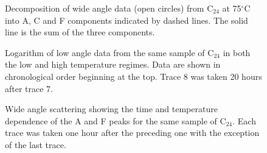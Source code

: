 \begin{figure}
\centerline {}
\caption{Decomposition of wide angle data (open circles) from C$_{24}$ 
at 75$^{\circ}$C into A, C and F components indicated by dashed lines.
The solid line is the sum of the three components.
\label{fig7}}
\end{figure}

\begin{figure}
\centerline {}
\caption{Logarithm of low angle data from the same sample of C$_{24}$ in both
the low and high temperature regimes.  Data are shown in chronological order
beginning at the top.   Trace 8 was taken 20 hours after trace 7.  
\label{fig8}}
\end{figure}

\begin{figure}
\centerline {}
\caption{Wide angle scattering showing the time and temperature dependence
of the A and F peaks for the same sample of C$_{24}$.  
Each trace was taken one hour after the preceding one with the exception
of the last trace.
\label{fig9}}
\end{figure}


